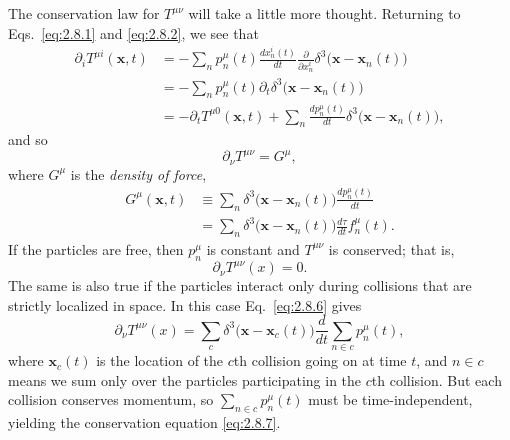 The conservation law for \(T^{\mu\nu}\) will take a little more thought.
Returning to Eqs.~\eqref{eq:2.8.1} and \eqref{eq:2.8.2}, we see that
\[
\begin{aligned}
  \partial_i T^{\mu i}(\mathbf x,t)
  &=-\sum_n p_n^\mu(t)\frac{dx_n^i(t)}{dt}
    \frac{\partial}{\partial x_n^i}
    \delta^3\bigl(\mathbf x-\mathbf x_n(t)\bigr)\\
  &=-\sum_n p_n^\mu(t)\partial_t
    \delta^3\bigl(\mathbf x-\mathbf x_n(t)\bigr)\\
  &=-\partial_t T^{\mu0}(\mathbf x,t)
    +\sum_n\frac{dp_n^\mu(t)}{dt}
     \delta^3\bigl(\mathbf x-\mathbf x_n(t)\bigr),
\end{aligned}
\]
and so
\begin{equation}
  \partial_\nu T^{\mu\nu}=G^\mu ,
  \tag{2.8.6}\label{eq:2.8.6}
\end{equation}
where \(G^\mu\) is the \emph{density of force},
\[
\begin{aligned}
  G^\mu(\mathbf x,t)
  &\equiv\sum_n\delta^3\bigl(\mathbf x-\mathbf x_n(t)\bigr)
      \frac{dp_n^\mu(t)}{dt}\\
  &=\sum_n\delta^3\bigl(\mathbf x-\mathbf x_n(t)\bigr)
      \frac{d\tau}{dt}f_n^\mu(t).
\end{aligned}
\]
If the particles are free, then \(p_n^\mu\) is constant and \(T^{\mu\nu}\)
is conserved; that is,
\begin{equation}
  \partial_\nu T^{\mu\nu}(x)=0 .
  \tag{2.8.7}\label{eq:2.8.7}
\end{equation}
The same is also true if the particles interact only during collisions that are
strictly localized in space. In this case Eq.~\eqref{eq:2.8.6} gives
\[
  \partial_\nu T^{\mu\nu}(x)
  =\sum_c\delta^3\bigl(\mathbf x-\mathbf x_c(t)\bigr)
    \frac{d}{dt}\sum_{n\in c}p_n^\mu(t),
\]
where \(\mathbf x_c(t)\) is the location of the \(c\)th collision going on at
time \(t\), and \(n\in c\) means we sum only over the particles participating
in the \(c\)th collision. But each collision conserves momentum, so
\(\sum_{n\in c}p_n^\mu(t)\) must be time-independent, yielding the
conservation equation \eqref{eq:2.8.7}.

